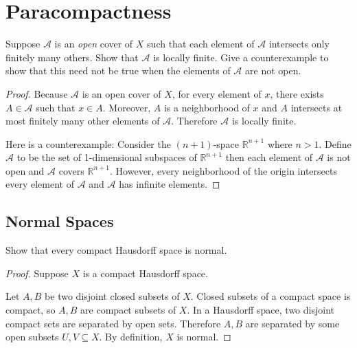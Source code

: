 \section*{Paracompactness}

\begin{exercise}{4.73}
	Suppose $\mathscr{A}$ is an \textit{open} cover of $X$ such that each element of $\mathscr{A}$ intersects only finitely many others. Show that $\mathscr{A}$ is locally finite. Give a counterexample to show that this need not be true when the elements of $\mathscr{A}$ are not open.
\end{exercise}

\begin{proof}
	Because $\mathscr{A}$ is an open cover of $X$, for every element of $x$, there exists $A\in\mathscr{A}$ such that $x\in A$. Moreover, $A$ is a neighborhood of $x$ and $A$ intersects at most finitely many other elements of $\mathscr{A}$. Therefore $\mathscr{A}$ is locally finite.

	Here is a counterexample: Consider the $(n+1)$-space $\mathbb{R}^{n+1}$ where $n > 1$. Define $\mathscr{A}$ to be the set of 1-dimensional subspaces of $\mathbb{R}^{n+1}$ then each element of $\mathscr{A}$ is not open and $\mathscr{A}$ covers $\mathbb{R}^{n+1}$. However, every neighborhood of the origin intersects every element of $\mathscr{A}$ and $\mathscr{A}$ has infinite elements.
\end{proof}

\subsection*{Normal Spaces}

\begin{exercise}{4.78}
	Show that every compact Hausdorff space is normal.
\end{exercise}

\begin{proof}
	Suppose $X$ is a compact Hausdorff space.

	Let $A, B$ be two disjoint closed subsets of $X$. Closed subsets of a compact space is compact, so $A, B$ are compact subsets of $X$. In a Hausdorff space, two disjoint compact sets are separated by open sets. Therefore $A, B$ are separated by some open subsets $U, V\subseteq X$. By definition, $X$ is normal.
\end{proof}

